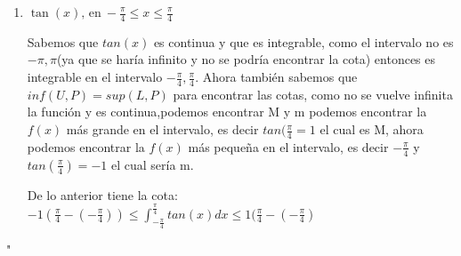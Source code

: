 \documentclass[12pt]{article}
\begin{document}
\begin{enumerate}[\hspace{9px} a)]
    \item \(\tan(x) \text{, en} \ -\displaystyle\frac{\pi}{4} \leq x \leq \frac{\pi}{4}\)

    Sabemos que $tan(x)$ es continua y que es integrable, como el intervalo no es $-\pi,\pi$(ya que se haría infinito y no se podría encontrar la cota) entonces es integrable en el intervalo \(-\frac{\pi}{4},\frac{\pi}{4}\). Ahora también sabemos que $inf(U,P)=sup(L,P)$ para encontrar las cotas, como no se vuelve infinita la función y es continua,podemos encontrar M y m podemos encontrar la $f(x)$ más grande en el intervalo, es decir $tan(\frac{\pi}{4}=1$ el cual es M, ahora podemos encontrar la $f(x)$ más pequeña en el intervalo, es decir $-\frac{\pi}{4}$
    y \(tan(\frac{\pi}{4})=-1\) el cual sería m.\medskip

    De lo anterior tiene la cota:\medskip
    \(-1(\frac{\pi}{4}-(-\frac{\pi}{4})) \leq \int_{-\frac{\pi}{4}}^{\frac{\pi}{4}}tan(x)dx \leq 1(\frac{\pi}{4}-(-\frac{\pi}{4})\)

\end{enumerate}"
\end{document}
